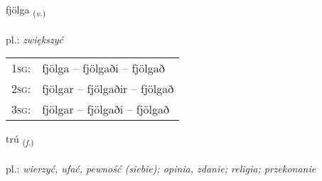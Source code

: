 \documentclass[frontgrid, backgrid]{flacards}\usepackage[]{graphicx}\usepackage[]{xcolor}
\begin{document}
\renewcommand{\flhead}{\vskip5pt \fboxsep=0pt {\small\bfseries\footnotesize Sagnorð | Verb}}
\renewcommand{\fcfoot}{\vskip5pt \fboxsep=0pt \hspace{2pt}{\small\bfseries\footnotesize 1K}}

\renewcommand{\blhead}{\vskip5pt {\small\bfseries\footnotesize Sagnorð | Verb }}
\renewcommand{\bcfoot}{\vskip5pt \hspace{2pt}{\small\bfseries\footnotesize 1K}}


{fjölga \small{\textsubscript{(\textit{v.})}} \\[1ex] %
\textphonetic{[fjœlka]} \\
pl.: \emph{zwiększyć} \\  [2ex]
\renewcommand*{\arraystretch}{0.8}
\begin{tabular}{p{1cm}l}
\textsc{1sg}: & fjölga -- fjölgaði -- fjölgað \\ 
\textsc{2sg}: & fjölgar -- fjölgaðir -- fjölgað \\ 
\textsc{3sg}: & fjölgar -- fjölgaði -- fjölgað \\ 
\end{tabular}
}

\renewcommand{\flhead}{\vskip5pt \fboxsep=0pt {\small\bfseries\footnotesize Nafnorð | Noun}}
\renewcommand{\fcfoot}{\vskip5pt \fboxsep=0pt \hspace{2pt}{\small\bfseries\footnotesize 1K}}

\renewcommand{\blhead}{\vskip5pt {\small\bfseries\footnotesize Nafnorð | Noun }}
\renewcommand{\bcfoot}{\vskip5pt \hspace{2pt}{\small\bfseries\footnotesize 1K}}


{trú \small{\textsubscript{(\textit{f.})}} \\[1ex] %
\textphonetic{[tʰruː]} \\
pl.: \emph{wierzyć, ufać, pewność (siebie); opinia, zdanie; religia; przekonanie} \\  [2ex]
\renewcommand*{\arraystretch}{0.8}
}
\end{document}
